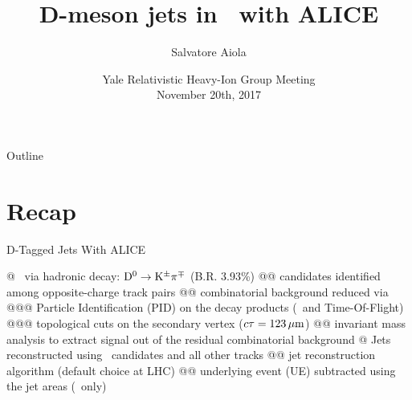 \documentclass[xcolor={usenames,dvipsnames}]{beamer}
\title[D-meson jets in \pp\ collisions with ALICE] %
{D-meson jets in \pp\ with ALICE}
\author[Salvatore Aiola]%
{Salvatore Aiola}
\institute[Yale University] %
{Yale University}
\date[Nov. 20th, 2017] %
{Yale Relativistic Heavy-Ion Group Meeting \\
November 20th, 2017}
\begin{document}
\begin{frame}
  \titlepage
\end{frame}

\begin{frame}{Outline}
   \tableofcontents
\end{frame}








\section{Recap}

\begin{frame}[fragile]{D-Tagged Jets With ALICE}
\begin{easylist}[itemize]
@ \Dzero\ via \alert{hadronic decay}: $\mathrm{D^{0}}\rightarrow{\rm K}^{\pm}\pi^{\mp}$ (B.R. 3.93\%)
@@ candidates identified among \alert{opposite-charge} track pairs
@@ combinatorial background reduced via
@@@ \alert{Particle Identification} (PID) on the decay products (\dedx\ and Time-Of-Flight)
@@@ \alert{topological cuts} on the secondary vertex ($c\tau=123\,\mu{\rm m}$)
@@ \alert{invariant mass analysis} to extract signal out of the residual combinatorial background
@ Jets reconstructed using \Dzero\ candidates and all other tracks
@@ \alert{\antikt} jet reconstruction algorithm (default choice at LHC)
@@ \alert{underlying event} (UE) subtracted using the jet areas (\PbPb\ only)
\end{easylist}
\end{frame}
\end{document}
